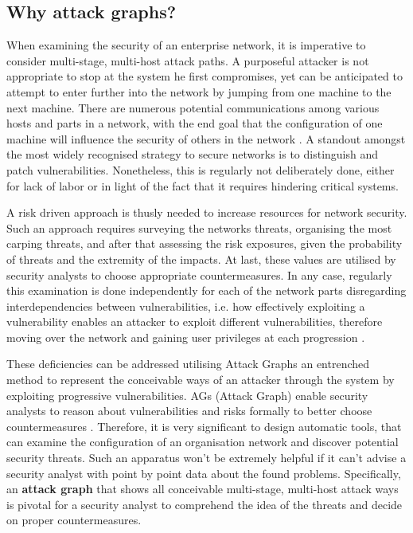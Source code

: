 \subsection{Why attack graphs?}
When examining the security of an enterprise network, it is imperative to consider multi-stage, multi-host attack paths. A purposeful attacker is not appropriate to stop at the system he first compromises, yet can be anticipated to attempt to enter further into the network by jumping from one machine to the next machine. There are numerous potential communications among various hosts and parts in a network, with the end goal that the configuration of one machine will influence the security of others in the network \cite{ou2006scalable}. A standout amongst the most widely recognised strategy to secure networks is to distinguish and patch vulnerabilities. Nonetheless, this is regularly not deliberately done, either for lack of labor or in light of the fact that it requires hindering critical systems. 

A risk driven approach is thusly needed to increase resources for network security. Such an approach requires surveying the networks threats, organising the most carping threats, and after that assessing the risk exposures, given the probability of threats and the extremity of the impacts. At last, these values are utilised by security analysts to choose appropriate countermeasures. In any case, regularly this examination is done independently for each of the network parts disregarding interdependencies between vulnerabilities, i.e. how effectively exploiting a vulnerability enables an attacker to exploit different vulnerabilities, therefore moving over the network and gaining user privileges at each progression \cite{munoz2016efficient}.

These deficiencies can be addressed utilising Attack Graphs an entrenched method to represent the conceivable ways of an attacker through the system by exploiting progressive vulnerabilities. AGs (Attack Graph) enable security analysts to reason about vulnerabilities and risks formally to better choose countermeasures \cite{munoz2016efficient}. Therefore, it is very significant to design automatic tools, that can examine the configuration of an organisation network and discover potential security threats. Such an apparatus won't be extremely helpful if it can't advise a security analyst with point by point data about the found problems. Specifically, an \textbf{attack graph} that shows all conceivable multi-stage, multi-host attack ways is pivotal for a security analyst to comprehend the idea of the threats and decide on proper countermeasures.

